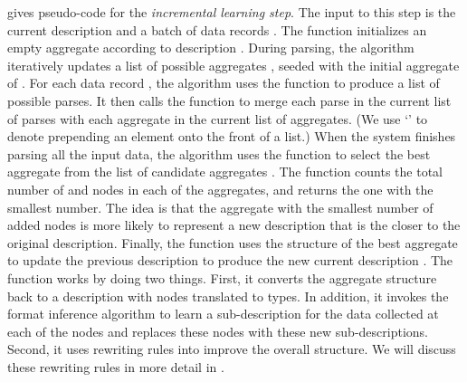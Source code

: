  gives pseudo-code for the {\em incremental
  learning step}.  The input to this step is the current description
 and a batch of data records .  The 
function initializes an empty aggregate according to description
.  During parsing, the algorithm iteratively updates a list of
possible aggregates , seeded with the initial aggregate of
.  For each data record , the algorithm uses the
 function to produce a list  of possible parses.  It
then calls the  function to merge each parse  in
the current list of parses with each aggregate  in the current
list of aggregates.  (We use `\cd{::}' to denote prepending an element
onto the front of a list.)  When the system finishes parsing all the
input data, the algorithm uses the  function to
select the best aggregate from the list of candidate aggregates
.  The  function counts the total number of
 and  nodes in each of the aggregates, and returns
the one with the smallest number.
The idea is that the aggregate with the smallest number of added nodes is 
more likely to represent a new description
that is the closer to the original description. 
Finally, the  function uses the structure of the best
aggregate to update the previous description  to produce the new
current description .  The  function works by
doing two things.
First, it converts the aggregate structure back to a \pads{} description
with  nodes translated to  types. In addition,
it invokes the \learnpads{} format inference
algorithm to learn a sub-description for the data collected 
at each of the  nodes
and replaces these  nodes with these new sub-descriptions. 
Second, it uses rewriting
rules into improve the overall structure.
We will discuss these rewriting rules in more
detail in .


